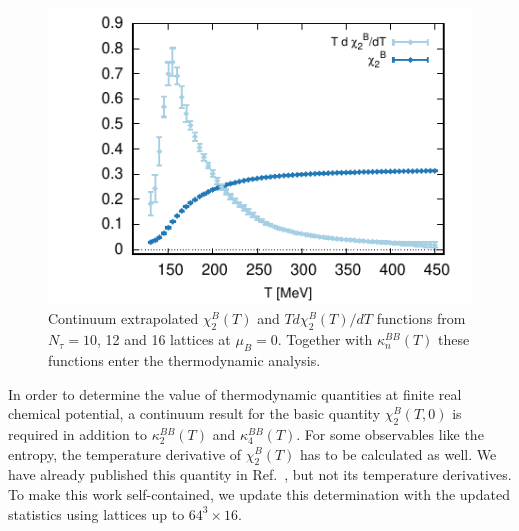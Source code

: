 \documentclass[aps,prd,twocolumn,superscriptaddress]{revtex4-2}
\begin{document}
\begin{figure}
\begin{center}
\includegraphics[width=\linewidth]{figures/chi2B_chi2Bprime.pdf}
\caption{\label{fig:chider}
Continuum extrapolated $\chi^B_2(T)$ and $T d\chi^B_2(T)/dT$ functions
from $N_\tau=10$, 12 and 16 lattices at $\mu_B=0$. Together with 
$\kappa^{BB}_n(T)$ these functions enter the thermodynamic analysis.
}
\end{center}
\end{figure}


In order to determine the value of thermodynamic quantities at finite real
chemical potential, a continuum result for the basic quantity $\chi^B_2(T,0)$
is required in addition to $\kappa_2^{BB}(T)$ and $\kappa_4^{BB}(T)$.  For some
observables like the entropy, the temperature derivative of $\chi^B_2(T)$ 
has to be calculated
as well.  We have already published this quantity in
Ref.~\cite{Bellwied:2015lba}, but
not its temperature derivatives.  To make this work self-contained, we update
this determination with the updated statistics using lattices up to
$64^3\times16$.
\end{document}
